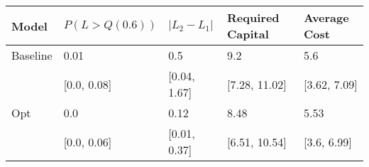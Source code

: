 \begin{tabular}{lllll}
\toprule
   Model & $P(L > Q(0.6))$ & $|L_2 - L_1|$ & Required Capital & Average Cost \\
\midrule
Baseline &            0.01 &           0.5 &              9.2 &          5.6 \\
         &     [0.0, 0.08] &  [0.04, 1.67] &    [7.28, 11.02] & [3.62, 7.09] \\
     Opt &             0.0 &          0.12 &             8.48 &         5.53 \\
         &     [0.0, 0.06] &  [0.01, 0.37] &    [6.51, 10.54] &  [3.6, 6.99] \\
\bottomrule
\end{tabular}
